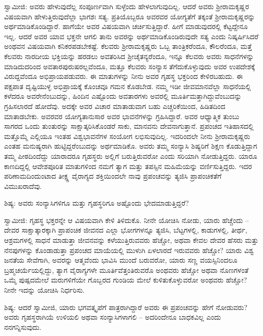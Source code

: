 ಸ್ವಾಮೀಜಿ: ಅವರು ಹೇಳುವುದೆಲ್ಲ ಸಂಪೂರ್ಣವಾಗಿ ಸುಳ್ಳೆಂದು ಹೇಳಲಾಗುವುದಿಲ್ಲ. ಆದರೆ ಅವರು ಶ‍್ರೀರಾಮಕೃಷ್ಣರ ವಿಷಯವಾಗಿ ಹೇಳುತ್ತಿರುವುದೆಲ್ಲಾ ಭಾಗಶಃ ಸತ್ಯ. ಪ್ರತಿಯೊಬ್ಬರೂ ಅವರವರ ಯೋಗ್ಯತೆಗೆ ತಕ್ಕಂತೆ ಶ‍್ರೀರಾಮಕೃಷ್ಣರನ್ನು ಅರ್ಥಮಾಡಿಕೊಂಡಿದ್ದಾರೆ. ಹಾಗೆಯೇ ಅವರ ವಿಷಯವಾಗಿ ಚರ್ಚಿಸುತ್ತಿದ್ದಾರೆ. ಹೀಗೆ ಮಾಡುವುದರಲ್ಲಿ ಕೆಟ್ಟದ್ದೇನೂ ಇಲ್ಲ. ಆದರೆ ಅವರ ಯಾವ ಭಕ್ತನೇ ಆಗಲಿ ತಾನು ಅವರನ್ನು ಅರ್ಥಮಾಡಿಕೊಂಡಿರುವುದೇ ಸತ್ಯ ಎಂದು ನಿಷ್ಕರ್ಷಿಸಿದರೆ ಅಂಥವನ ವಿಷಯವಾಗಿ ಕನಿಕರಪಡಬೇಕಷ್ಟೆ. ಕೆಲವರು ಶ‍್ರೀರಾಮಕೃಷ್ಣರು ಒಬ್ಬ ತಾಂತ್ರಿಕರೆಂದೂ, ಕೌಲರೆಂದೂ, ಮತ್ತೆ ಕೆಲವರು ನಾರದೀಯ ಭಕ್ತಿಯನ್ನು ಹರಡಲು ಅವತರಿಸಿದ ಶ‍್ರೀಚೈತನ್ಯರೆಂದೂ, ಇನ್ನೂ ಕೆಲವರು ಅವರು ಸಾಧನೆಗಳನ್ನು ಮಾಡಿದುದರಿಂದ ಅವತಾರಪುರುಷರಲ್ಲವೆಂದೂ, ಮತ್ತೂ ಕೆಲವರು ಸಂನ್ಯಾಸ ತೆಗೆದುಕೊಳ್ಳುವುದು ಅವರ ಉಪದೇಶಕ್ಕೆ ವಿರುದ್ದವೆಂದೂ ಅಭಿಪ್ರಾಯಪಡುವರು. ಈ ಮಾತುಗಳನ್ನು ನೀನು ಅವರ ಗೃಹಸ್ಥ ಭಕ್ತರಿಂದ ಕೇಳಿರಬಹುದು. ಈ ಪಕ್ಷಪಾತ ದೃಷ್ಟಿಯುಳ್ಳ ಅಭಿಪ್ರಾಯಕ್ಕೆ ಕೊಂಚವೂ ಗಮನ ಕೊಡಬೇಡ. ನಮ್ಮ ಇಡೀ ಜೀವಮಾನವೆಲ್ಲಾ ಸಾಧನೆಯಲ್ಲಿ ಕಳೆದರೂ ಅವರೇನೆಂಬುದನ್ನು, ಹಿಂದಿನ ಎಷ್ಟೊಂದು ಅವತಾರಗಳು ಅವರಲ್ಲಿ ಮೂರ್ತಿಮತ್ತಾಗಿದ್ದುವೆಂಬುದನ್ನು ಗ್ರಹಿಸಲಾರದೆ ಹೋದೆವು. ಅದಕ್ಕೇ ಅವರ ವಿಚಾರ ಮಾತಾಡುವಾಗ ಬಹು ಎಚ್ಚರಿಕೆಯಿಂದ, ಹಿಡಿತದಿಂದ ಮಾತಾಡಬೇಕು. ಅವರವರ ಯೋಗ್ಯತಾನುಸಾರ ಅವರ ಭಾವನೆಗಳನ್ನು ಗ್ರಹಿಸಿದ್ದಾರೆ. ಅವರ ಆಧ್ಯಾತ್ಮಿಕ ತುಂಬು ಸಾಗರದ ಒಂದು ತುಂತುರನ್ನು ಸಾಕ್ಷಾತ್ಕರಿಸಿಕೊಂಡರೆ ಸಾಕು, ಮಾನವನು ದೇವನಾಗುತ್ತಾನೆ. ಪ್ರಪಂಚದ ಇತಿಹಾಸದಲ್ಲಿ ಮತ್ತೊಮ್ಮೆ ಎಲ್ಲಿಯೂ ಇಂತಹ ವಿಶ್ವಭಾವನೆಗಳ ಸಂಯೋಗ ಲಭಿಸುವುದಿಲ್ಲ. ಇದರಿಂದಲೇ ನೀನು ಶ‍್ರೀರಾಮಕೃಷ್ಣರು ಎಂತಹ ಮನುಷ್ಯರಾಗಿ ಹುಟ್ಟಿದ್ದರೆಂಬುದನ್ನು ಅರ್ಥಮಾಡಿಕೊ. ಅವರು ತಮ್ಮ ಸಂನ್ಯಾಸಿ ಶಿಷ್ಯರಿಗೆ ಶಿಕ್ಷಣ ಕೊಡುತ್ತಿದ್ದಾಗ ತಮ್ಮ ಪೀಠದಿಂದೆದ್ದು ಯಾರಾದರೂ ಗೃಹಸ್ಥರು ಅಲ್ಲಿಗೆ ಬರುತ್ತಿರುವರೋ ಎಂದು ಸರಿಯಾಗಿ ನೋಡುತ್ತಿದ್ದರು. ಯಾರೂ ಕಾಣದಿದ್ದಲ್ಲಿ ಆವೇಶಪೂರಿತ ಮಾತುಗಳಿಂದ ನಮಗೆ ತ್ಯಾಗ ಮತ್ತು ತಪಸ್ಸಿನ ಮಹಿಮೆಯನ್ನು ವರ್ಣಿಸುತ್ತಿದ್ದರು. ಇದರ ಪರಿಣಾಮದಿಂದುಂಟಾದ ತೀಕ್ಷ್ಣ ವೈರಾಗ್ಯದ ಶಕ್ತಿಯಿಂದಲೇ ನಾವು ಪ್ರಪಂಚವನ್ನು ತ್ಯಜಿಸಿ ಪ್ರಾಪಂಚಿಕತೆಗೆ ವಿಮುಖರಾದೆವು.

ಶಿಷ್ಯ: ಅವರು ಸಂನ್ಯಾಸಿಗಳಿಗೂ ಮತ್ತು ಗೃಹಸ್ಥರಿಗೂ ಅಷ್ಟೊಂದು ಭೇದಮಾಡುತ್ತಿದ್ದರೆ?

ಸ್ವಾಮೀಜಿ: ಗೃಹಸ್ಥ ಭಕ್ತರನ್ನೇ ಆ ವಿಷಯವಾಗಿ ಕೇಳಿ ತಿಳಿದುಕೊ. ನೀನೇ ಯೋಚಿಸಿ ನೋಡು, ಯಾರು ಹೆಚ್ಚೆಂದು – ದೇವರ ಸಾಕ್ಷಾತ್ಕಾರಕ್ಕಾಗಿ ಪ್ರಾಪಂಚಿಕ ಜೀವನದ ಎಲ್ಲಾ ಭೋಗಗಳನ್ನೂ ತ್ಯಜಿಸಿ, ಬೆಟ್ಟಗಳಲ್ಲಿ, ಕಾಡುಗಳಲ್ಲಿ, ತೀರ್ಥ, ಆಶ್ರಮಗಳಲ್ಲಿ ಸಾಧನೆ ಮಾಡುತ್ತಾ ಜೀವನವನ್ನು ಕಳೆಯುತ್ತಿರುವವರು ಹೆಚ್ಚೋ, ಅಥವಾ ಕೇವಲ ದೇವರ ಹೆಸರು ಮತ್ತು ನೆನಪುಗಳನ್ನು ಕೊಂಡಾಡುತ್ತಾ ಪ್ರಪಂಚದ ಮಾಯೆಯಲ್ಲಿ ಮುಳುಗಿ ಏಳಲಾರದೆ ಇರುವವರು ಹೆಚ್ಚೋ? ಯಾರು ವಿಶ್ವ ಜನತೆಯ ಸೇವೆಗಾಗಿ, ಅವರನ್ನು ಆತ್ಮವೆಂದು ಭಾವಿಸಿ ಮುಂದೆ ಬರುವರೋ, ಯಾರು ಸಣ್ಣ ವಯಸ್ಸಿನಿಂದಲೂ ಬ್ರಹ್ಮಚರ್ಯೆಯಲ್ಲಿದ್ದು, ತ್ಯಾಗ ವೈರಾಗ್ಯಗಳೇ ಮೂರ್ತಿವೆತ್ತಂತಿರುವರೊ ಅಂಥವರು ಹೆಚ್ಚೋ ಅಥವಾ ನೊಣಗಳಂತೆ ಒಮ್ಮೆ ಪುಷ್ಪದಮೇಲೆ ಮರುಗಳಿಗೆಯೇ ಗೊಬ್ಬರದ ಗುಂಡಿಯ ಮೇಲೆ ಕುಳಿತುಕೊಳ್ಳುವರೋ ಅಂಥವರು ಹೆಚ್ಚೋ? ನೀನೇ ಇದನ್ನು ಯೋಚಿಸಿ ನಿರ್ಧರಿಸು.

ಶಿಷ್ಯ: ಆದರೆ ಸ್ವಾಮೀಜಿ, ಯಾರು ಭಗವತ್ಕೃಪೆಗೆ ಪಾತ್ರರಾಗಿದ್ದಾರೆ ಅವರು ಈ ಪ್ರಪಂಚವನ್ನು ಹೇಗೆ ನೋಡುವರು? ಅವರು ಗೃಹಸ್ಥರಾಗಿಯೆ ಉಳಿಯಲಿ ಅಥವಾ ಸಂನ್ಯಾಸಿಗಳಾಗಲಿ – ಅದರಿಂದೇನೂ ಬಾಧಕವಿಲ್ಲ ಎಂದು ನನಗನ್ನಿಸುವುದು.

